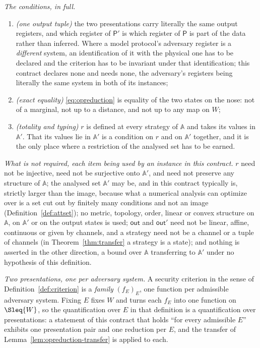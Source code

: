 \begin{definition}
\emph{The conditions, in full.}
\begin{enumerate}[label=(R\arabic*),leftmargin=3.0em]
\item \emph{(one output tuple)} the two presentations carry literally the same
  output registers, and which register of $\mathsf{P}'$ is which register of
  $\mathsf{P}$ is part of the data rather than inferred. Where a model
  protocol's adversary register is a \emph{different} system, an
  identification of it with the physical one has to be declared and the
  criterion has to be invariant under that identification; this contract
  declares none and needs none, the adversary's registers being literally the
  same system in both of its instances;
\item \emph{(exact equality)} \eqref{eq:opreduction} is equality of the two
  states on the nose: not of a marginal, not up to a distance, and not up to
  any map on $W$;
\item \emph{(totality and typing)} $r$ is defined at every strategy of
  $\mathbb{A}$ and takes its values in $\mathbb{A}'$. That its values lie in
  $\mathbb{A}'$ is a condition on $r$ and on $\mathbb{A}'$ together, and it is
  the only place where a restriction of the analysed set has to be earned.
\end{enumerate}

\emph{What is not required, each item being used by an instance in this
contract.} $r$ need not be injective, need not be surjective onto
$\mathbb{A}'$, and need not preserve any structure of $\mathbb{A}$; the
analysed set $\mathbb{A}'$ may be, and in this contract typically is, strictly
larger than the image, because what a numerical analysis can optimize over is
a set cut out by finitely many conditions and not an image
(Definition~\ref{def:attset}); no metric, topology, order, linear or convex
structure on $\mathbb{A}$, on $\mathbb{A}'$ or on the output states is used;
$\mathsf{out}$ and $\mathsf{out}'$ need not be linear, affine, continuous or
given by channels, and a strategy need not be a channel or a tuple of
channels (in Theorem~\ref{thm:transfer} a strategy is a state); and nothing
is asserted in the other direction, a bound over $\mathbb{A}$ transferring to
$\mathbb{A}'$ under no hypothesis of this definition.

\emph{Two presentations, one per adversary system.} A security criterion in
the sense of Definition~\ref{def:criterion} is a \emph{family} $(f_E)_E$, one
function per admissible adversary system. Fixing $E$ fixes $W$ and turns each
$f_E$ into one function on $\Sleq{W}$, so the quantification over $E$ in that
definition is a quantification over presentations: a statement of this
contract that holds ``for every admissible $E$'' exhibits one presentation
pair and one reduction per $E$, and the transfer of
Lemma~\ref{lem:opreduction-transfer} is applied to each.
\end{definition}

